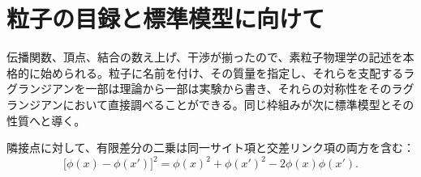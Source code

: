 \section{粒子の目録と標準模型に向けて}

伝播関数、頂点、結合の数え上げ、干渉が揃ったので、素粒子物理学の記述を本格的に始められる。粒子に名前を付け、その質量を指定し、それらを支配するラグランジアンを一部は理論から一部は実験から書き、それらの対称性をそのラグランジアンにおいて直接調べることができる。同じ枠組みが次に標準模型とその性質へと導く。

\begin{classroomqa}
\end{classroomqa}

\begin{classroomqa}
\end{classroomqa}

隣接点に対して、有限差分の二乗は同一サイト項と交差リンク項の両方を含む：
\begin{equation}
\bigl[\phi(x)-\phi(x')\bigr]^2
=
\phi(x)^2+\phi(x')^2-2\phi(x)\phi(x').
\end{equation}

\begin{classroomqa}
\end{classroomqa}
